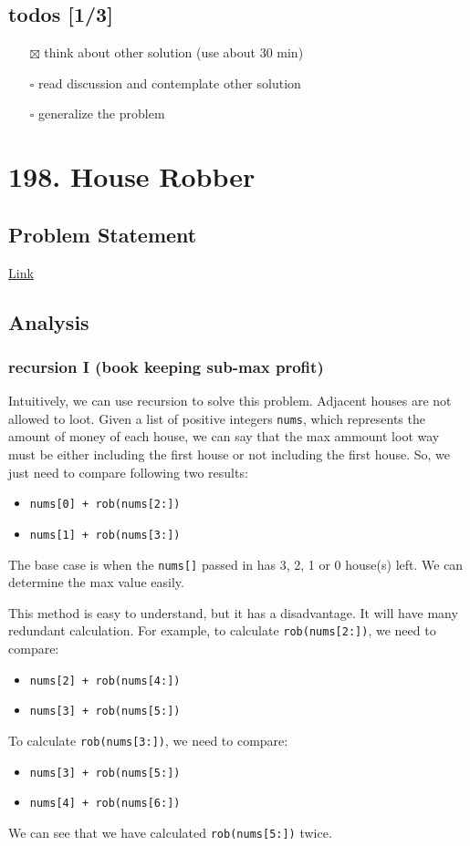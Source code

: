 \documentclass[11pt]{article}
\begin{document}
\subsection{todos [1/3]}
\label{sec:org3a171f5}
\begin{itemize}
\item[{$\boxtimes$}] think about other solution (use about 30 min)
\item[{$\square$}] read discussion and contemplate other solution
\item[{$\square$}] generalize the problem
\end{itemize}
\section{198. House Robber}
\label{sec:org778103f}
\subsection{Problem Statement}
\label{sec:org0591cac}
\href{https://leetcode.com/problems/house-robber/}{Link}
\subsection{Analysis}
\label{sec:orgd981b78}
\subsubsection{recursion I (book keeping sub-max profit)}
\label{sec:orge1af39c}
Intuitively, we can use recursion to solve this problem. Adjacent houses are not allowed to loot. Given a list of positive integers \texttt{nums}, which represents the amount of money of each house, we can say that the max ammount loot way must be either including the first house or not including the first house. So, we just need to compare following two results:
\begin{itemize}
\item \texttt{nums[0] + rob(nums[2:])}
\item \texttt{nums[1] + rob(nums[3:])}
\end{itemize}
The base case is when the \texttt{nums[]} passed in has 3, 2, 1 or 0 house(s) left. We can determine the max value easily.

This method is easy to understand, but it has a disadvantage. It will have many redundant calculation. For example, to calculate \texttt{rob(nums[2:])}, we need to compare:
\begin{itemize}
\item \texttt{nums[2] + rob(nums[4:])}
\item \texttt{nums[3] + rob(nums[5:])}
\end{itemize}
To calculate \texttt{rob(nums[3:])}, we need to compare:
\begin{itemize}
\item \texttt{nums[3] + rob(nums[5:])}
\item \texttt{nums[4] + rob(nums[6:])}
\end{itemize}
We can see that we have calculated \texttt{rob(nums[5:])} twice.
\end{document}
